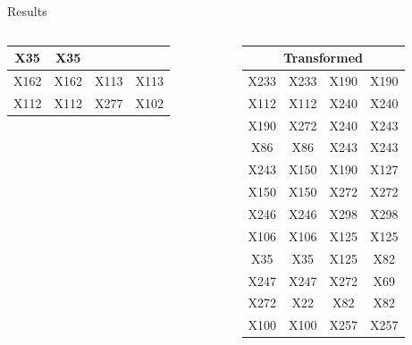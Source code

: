 \documentclass[final]{beamer} %
\newcommand{\boz}{\cellcolor{pathwaynode}}
\newcommand{\ghool}{\cellcolor{independentnode}}
\begin{document}
\begin{frame}{}
\begin{block}{Results}
\begin{columns}
\begin{column}{0.25\textwidth}
\begin{columns}
\begin{column}{0.5\textwidth}
\begin{tabular}{| c c || c c |}
                X35   &  X35  \\ \hline
                X162   &  X162  &
                \boz X113   &  \boz X113  \\ \hline
                X112   &  X112  &
                X277   &  X102  \\ \hline
              \end{tabular}
            \end{column}
            \begin{column}{0.5\textwidth}
              \center
              \tiny
              \begin{tabular}{| c c || c c |}
                \hline
                \toprule
                \multicolumn{4}{c}{Transformed} \\ 
                \midrule \hline
                X233   &  X233  &
                \boz X190   &  \boz X190  \\ \hline
                X112   &  X112  &
                \boz X240   &  \boz X240  \\ \hline
                \boz X190   &  \boz X272 &
                \boz X240   &  \boz X243  \\ \hline
                X86   &  X86  &
                \boz X243   &  \boz X243  \\ \hline
                \boz X243   &  \boz X150 &
                \boz X190   &  X127  \\ \hline
                \boz X150   &  \boz X150  &
                \boz X272   &  \boz X272  \\ \hline
                X246   &  X246  &
                X298   &  X298  \\ \hline
                X106   &  X106  &
                \boz X125   &  \boz X125  \\ \hline
                X35   &  X35  &
                \boz X125   &  \boz X82  \\ \hline
                X247   &  X247  &
                \boz X272   &  X69  \\ \hline
                \boz X272   &  \boz X22 &
                \boz X82   &  \boz X82  \\ \hline
                X100   &  X100  &
                \ghool X257   &  \ghool X257  \\ \hline
              \end{tabular}
            \end{column}
          \end{columns}
        \end{column}


\end{columns}
\end{block}
\end{frame}
\end{document}
